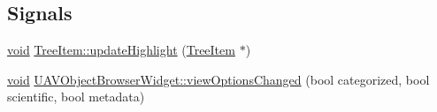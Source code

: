 \subsection*{\-Signals}
\begin{DoxyCompactItemize}
\item 
\hyperlink{group___u_a_v_objects_plugin_ga444cf2ff3f0ecbe028adce838d373f5c}{void} \hyperlink{group___u_a_v_object_browser_plugin_gab8702d2046500fbe3dd7cee66ebcda70}{\-Tree\-Item\-::update\-Highlight} (\hyperlink{class_tree_item}{\-Tree\-Item} $\ast$)
\item 
\hyperlink{group___u_a_v_objects_plugin_ga444cf2ff3f0ecbe028adce838d373f5c}{void} \hyperlink{group___u_a_v_object_browser_plugin_ga0fe8f51605067d863b1ac5bb6f6f5cbd}{\-U\-A\-V\-Object\-Browser\-Widget\-::view\-Options\-Changed} (bool categorized, bool scientific, bool metadata)
\end{DoxyCompactItemize}
